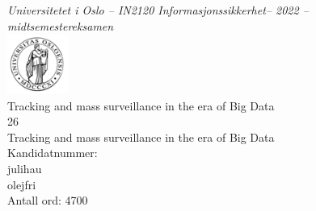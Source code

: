 \documentclass[11pt]{article}
\newcommand{\tittel}{Tracking and mass surveillance in the era of Big Data}
\newcommand{\temanr}{26}
\newcommand{\tematittel}{Tracking and mass surveillance in the era of Big Data}
\newcommand{\kandidatnrforside}{julihau \\ olejfri}
\newcommand{\antallord}{4700}
\begin{document}
 \thispagestyle{empty}
\begin{center}
\normalsize{\textit{Universitetet i Oslo -- IN2120 Informasjonssikkerhet-- 2022 -- midtsemestereksamen}} \\
\vspace{1cm}
\includegraphics[width=0.15\textwidth]{uio_logo.png} \\
\vspace{1cm}
\huge{\tittel} \\
\Large{\temanr} \\
\Large{\tematittel} \\
\vspace{1cm}
\Large{Kandidatnummer:} \\
\large{\kandidatnrforside} \\
\vspace{1cm}
\Large{Antall ord: \antallord} \\
\end{center}
\tableofcontents
\newpage
\end{document}
